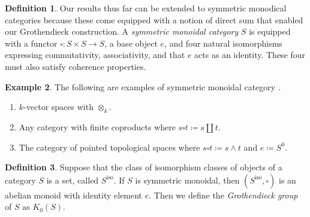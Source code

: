 \documentclass[10pt,letterpaper,cm]{nupset}
\theoremstyle{definition}
\newtheorem{definition}{Definition}
\newtheorem{exmp}[definition]{Example}
\theoremstyle{theorem}
\theoremstyle{remark}
\newcommand{\1}{\mathbf{1}}
\newcommand{\0}{\vec 0}
\DeclareMathOperator{\iso}{iso}
\begin{document}
\begin{definition}
Our results thus far can be extended to symmetric monodical categories because these come equipped with a notion of direct sum that enabled our Grothendieck construction. A \textit{symmetric monoidal category} $S$ is equipped with a functor $\square : S \times S \to S$, a base object $e$, and four natural isomorphisms expressing commutativity, associativity, and that $e$ acts as an identity. These four must also satisfy coherence properties.
\end{definition}

\begin{exmp} The following are examples of symmetric monoidal category	.
\begin{enumerate}
\item $k$-vector spaces with $\otimes_k$.
\item Any category with finite coproducts where $s \square t\coloneqq s \amalg t$.
\item The category of pointed topological spaces where $s \square t \coloneqq s \wedge t $ and $e\coloneqq S^0$.
\end{enumerate} 
\end{exmp}

\begin{definition}
Suppose that the class of isomorphism classes of objects of a category $S$ is a set, called $S^{\iso}$. If $S$ is symmetric monoidal, then $(S^{\iso}, \square)$ is an abelian monoid with identity element $e$. Then we define the \textit{Grothendieck group} of $S$ as $K_0(S)$.
\end{definition}
\end{document}
